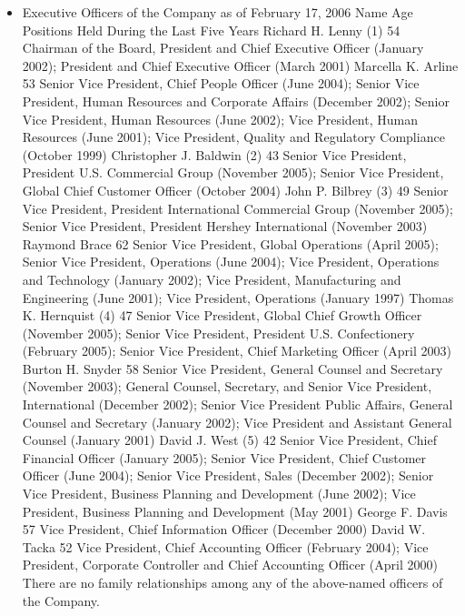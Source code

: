 \begin{itemize}
    \item Executive Officers of the Company as of February 17, 2006 Name Age Positions Held During the Last Five Years Richard H. Lenny (1) 54 Chairman of the Board, President and Chief Executive Officer (January 2002); President and Chief Executive Officer (March 2001) Marcella K. Arline 53 Senior Vice President, Chief People Officer (June 2004); Senior Vice President, Human Resources and Corporate Affairs (December 2002); Senior Vice President, Human Resources (June 2002); Vice President, Human Resources (June 2001); Vice President, Quality and Regulatory Compliance (October 1999) Christopher J. Baldwin (2) 43 Senior Vice President, President U.S. Commercial Group (November 2005); Senior Vice President, Global Chief Customer Officer (October 2004) John P. Bilbrey (3) 49 Senior Vice President, President International Commercial Group (November 2005); Senior Vice President, President Hershey International (November 2003) Raymond Brace 62 Senior Vice President, Global Operations (April 2005); Senior Vice President, Operations (June 2004); Vice President, Operations and Technology (January 2002); Vice President, Manufacturing and Engineering (June 2001); Vice President, Operations (January 1997) Thomas K. Hernquist (4) 47 Senior Vice President, Global Chief Growth Officer (November 2005); Senior Vice President, President U.S. Confectionery (February 2005); Senior Vice President, Chief Marketing Officer (April 2003) Burton H. Snyder 58 Senior Vice President, General Counsel and Secretary (November 2003); General Counsel, Secretary, and Senior Vice President, International (December 2002); Senior Vice President Public Affairs, General Counsel and Secretary (January 2002); Vice President and Assistant General Counsel (January 2001) David J. West (5) 42 Senior Vice President, Chief Financial Officer (January 2005); Senior Vice President, Chief Customer Officer (June 2004); Senior Vice President, Sales (December 2002); Senior Vice President, Business Planning and Development (June 2002); Vice President, Business Planning and Development (May 2001) George F. Davis 57 Vice President, Chief Information Officer (December 2000) David W. Tacka 52 Vice President, Chief Accounting Officer (February 2004); Vice President, Corporate Controller and Chief Accounting Officer (April 2000) There are no family relationships among any of the above-named officers of the Company.
\end{itemize}

